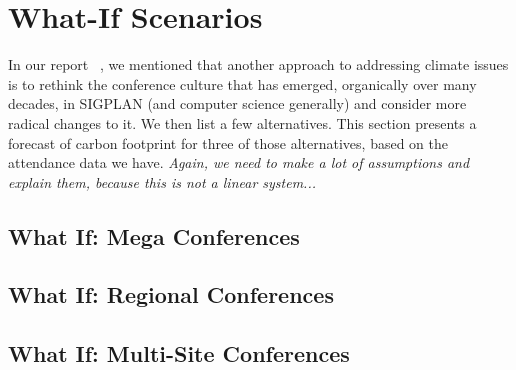 \section{What-If Scenarios}

In our report~%
, we mentioned that another approach to addressing climate issues is to rethink the conference culture that has emerged, organically over many decades, in SIGPLAN (and computer science generally) and consider more radical changes to it. We then list a few alternatives. This section presents a forecast of carbon footprint for three of those alternatives, based on the attendance data we have. \emph{Again, we need to make a lot of assumptions and explain them, because this is not a linear system...}

\subsection{What If: Mega Conferences}

\subsection{What If: Regional Conferences}

\subsection{What If: Multi-Site Conferences}


